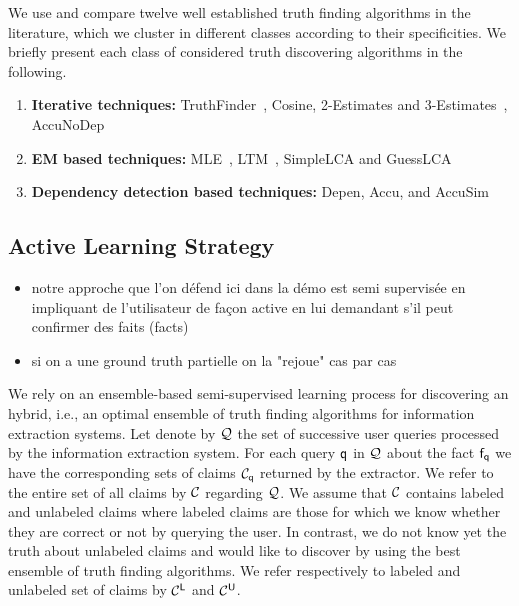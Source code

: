 

We use and compare twelve well established truth finding algorithms in the literature,
which we cluster in different classes according to their specificities.
We briefly present each class of considered truth discovering algorithms in the following.

\begin{enumerate}
 \item \textbf{Iterative techniques:} TruthFinder~\cite{YinHY08}, Cosine, 2-Estimates and 3-Estimates~\cite{GallandAMS10}, 
 AccuNoDep~\cite{DongBS09}
 \item \textbf{EM based techniques:} MLE~\cite{WangKLA12}, LTM~\cite{ZhaoRGH12}, SimpleLCA and GuessLCA~\cite{PasternackR13}
 \item \textbf{Dependency detection based techniques:} Depen, Accu, and AccuSim~\cite{DongBS09}
\end{enumerate}



\subsection{Active Learning Strategy}
\begin{itemize}
 \item notre approche que l'on défend ici dans la démo est  semi supervisée en impliquant de l'utilisateur de façon active
en lui demandant s'il peut confirmer des faits (facts)
\item si on a une ground truth partielle on la "rejoue" cas par cas
\end{itemize}

\medskip

We rely on an ensemble-based semi-supervised learning process for discovering an hybrid, i.e., an optimal ensemble of truth
finding algorithms for information extraction systems. Let denote by $\mathcal{Q}$ the set of successive user queries processed 
by the information extraction system. For each query $\mathsf{q}$ in $\mathcal{Q}$ about the fact $\mathsf{f}_{\mathsf{q}}$ we have the corresponding
sets of claims $\mathcal{C}_{\mathsf{q}}$ returned by the extractor. We refer to the entire set of all claims by $\mathcal{C}$ regarding $\mathcal{Q}$.
We assume that $\mathcal{C}$ contains labeled and unlabeled claims where labeled claims are those for which we  know whether they are correct
or not by querying the user. In contrast, we do not know yet the truth about unlabeled claims and would like to discover by using the best 
ensemble of truth finding algorithms. We refer respectively to labeled and unlabeled set of claims by $\mathcal{C}^{\mathsf{L}}$ and $\mathcal{C}^{\mathsf{U}}$.
